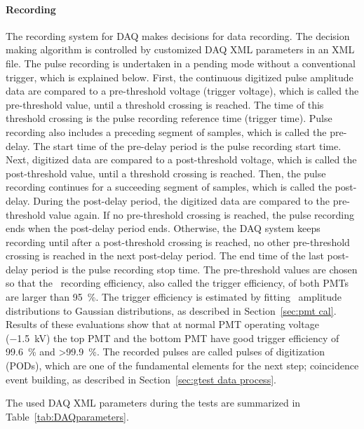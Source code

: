 \paragraph{Recording} %
The recording system for DAQ makes decisions for data recording. The decision making algorithm is controlled by customized DAQ XML parameters in an XML file. The pulse recording is undertaken in a pending mode without a conventional trigger, which is explained below. First, the continuous digitized pulse amplitude data are compared to a pre-threshold voltage (trigger voltage), which is called the pre-threshold value, until a threshold crossing is reached. The time of this threshold crossing is the pulse recording reference time (trigger time). Pulse recording also includes a preceding segment of samples, which is called the pre-delay. The start time of the pre-delay period is the pulse recording start time. Next, digitized data are compared to a post-threshold voltage, which is called the post-threshold value, until a threshold crossing is reached. Then, the pulse recording continues for a succeeding segment of samples, which is called the post-delay. During the post-delay period, the digitized data are compared to the pre-threshold value again. If no pre-threshold crossing is reached, the pulse recording ends when the post-delay period ends. Otherwise, the DAQ system keeps recording until after a post-threshold crossing is reached, no other pre-threshold crossing is reached in the next post-delay period. The end time of the last post-delay period is the pulse recording stop time. The pre-threshold values are chosen so that the \sphe\ recording efficiency, also called the trigger efficiency, of both PMTs are larger than \SI{95}{\percent}. The trigger efficiency is estimated by fitting \sphe\ amplitude distributions to Gaussian distributions, as described in Section~\ref{sec:pmt cal}. Results of these evaluations show that at normal PMT operating voltage (\SI{-1.5}{\kV}) the top PMT and the bottom PMT have good trigger efficiency of \SI{99.6}{\percent} and \SI{>99.9}{\percent}. The recorded pulses are called pulses of digitization (PODs), which are one of the fundamental elements for the next step; coincidence event building, as described in Section~\ref{sec:gtest data process}.

The used DAQ XML parameters during the tests are summarized in Table~\ref{tab:DAQparameters}.

